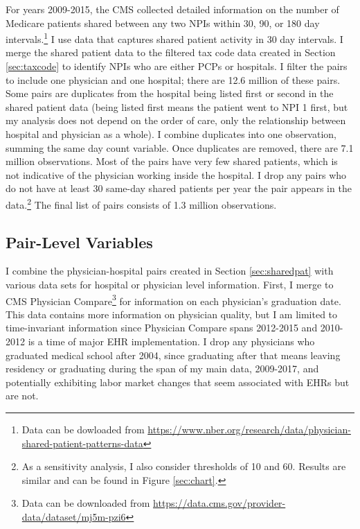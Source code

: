 \documentclass[12pt]{article}
\begin{document}
For years 2009-2015, the CMS collected detailed information on the number of Medicare patients shared between any two NPIs within 30, 90, or 180 day intervals.\footnote{Data can be dowloaded from \hyperlink{https://www.nber.org/research/data/physician-shared-patient-patterns-data}{https://www.nber.org/research/data/physician-shared-patient-patterns-data}} I use data that captures shared patient activity in 30 day intervals. I merge the shared patient data to the filtered tax code data created in Section \ref{sec:taxcode} to identify NPIs who are either PCPs or hospitals. I filter the pairs to include one physician and one hospital; there are 12.6 million of these pairs. Some pairs are duplicates from the hospital being listed first or second in the shared patient data (being listed first means the patient went to NPI 1 first, but my analysis does not depend on the order of care, only the relationship between hospital and physician as a whole). I combine duplicates into one observation, summing the same day count variable. Once duplicates are removed, there are 7.1 million observations. Most of the pairs have very few shared patients, which is not indicative of the physician working inside the hospital. I drop any pairs who do not have at least 30 same-day shared patients per year the pair appears in the data.\footnote{As a sensitivity analysis, I also consider thresholds of 10 and 60. Results are similar and can be found in Figure \ref{sec:chart}.} The final list of pairs consists of 1.3 million observations. 

\subsection{Pair-Level Variables}

I combine the physician-hospital pairs created in Section \ref{sec:sharedpat} with various data sets for hospital or physician level information. First, I merge to CMS Physician Compare\footnote{Data can be downloaded from \hyperlink{https://data.cms.gov/provider-data/dataset/mj5m-pzi6}{https://data.cms.gov/provider-data/dataset/mj5m-pzi6}} for information on each physician's graduation date. This data contains more information on physician quality, but I am limited to time-invariant information since Physician Compare spans 2012-2015 and 2010-2012 is a time of major EHR implementation. I drop any physicians who graduated medical school after 2004, since graduating after that means leaving residency or graduating during the span of my main data, 2009-2017, and potentially exhibiting labor market changes that seem associated with EHRs but are not. 
\end{document}
